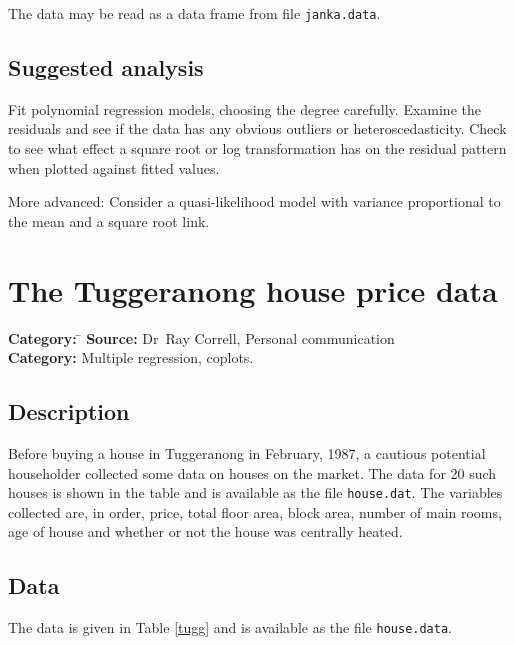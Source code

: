 \documentclass{article}
\newcommand{\code}[1]{\texttt{#1}}
\begin{document}
The data may be read as a data frame from file \code{janka.data}.

\subsection*{Suggested analysis}
Fit polynomial regression models, choosing the degree carefully.  Examine
the residuals and see if the data has any obvious outliers or
heteroscedasticity.  Check to see what effect a square root or log
transformation has on the residual pattern when plotted against fitted
values.

More advanced: Consider a quasi-likelihood model with variance proportional
to the mean and a square root link.

\clearpage\section{The Tuggeranong house price data}
\begin{tabbing}
\textbf{Category:} \= \kill
\textbf{Source:} \> Dr~Ray Correll, Personal communication\\
\textbf{Category:} \> Multiple regression, coplots.
\end{tabbing}

\subsection*{Description}
Before buying a house in Tuggeranong in February, 1987, a cautious
potential householder collected some data on houses on the market.  The
data for 20 such houses is shown in the table and is available as the
file  \code{house.dat}.  The variables collected are, in order, price,
total floor area, block area, number of main rooms, age of house and
whether or not the house was centrally heated.


\subsection*{Data}
The data is given in Table \ref{tugg} and is available as the file
\texttt{house.data}.
\end{document}
